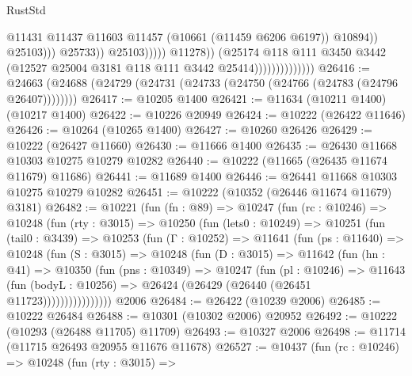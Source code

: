 \begin{lexlean}{RustStd}
\begin{coremodule}
                                                        @11431
                                                        @11437
                                                        @11603
                                                        @11457
                                                        (@10661 (@11459 @6206 @6197))
                                                        @10894))
                                                    @25103)))
                                              @25733))
                                          @25103)))))
                                @11278))
                            (@25174
                              @118
                              @111
                              @3450
                              @3442
                              (@12527 @25004 @3181 @118 @111 @3442 @25414))))))))))))))
@26416 := @24663 (@24688 (@24729 (@24731 (@24733 (@24750 (@24766 (@24783 (@24796 @26407))))))))
@26417 := @10205 @1400
@26421 := @11634 (@10211 @1400) (@10217 @1400)
@26422 := @10226 @20949
@26424 := @10222 (@26422 @11646)
@26426 := @10264 (@10265 @1400)
@26427 := @10260 @26426
@26429 := @10222 (@26427 @11660)
@26430 := @11666 @1400
@26435 := @26430 @11668 @10303 @10275 @10279 @10282
@26440 := @10222 (@11665 (@26435 @11674 @11679) @11686)
@26441 := @11689 @1400
@26446 := @26441 @11668 @10303 @10275 @10279 @10282
@26451 := @10222 (@10352 (@26446 @11674 @11679) @3181)
@26482 := @10221
    (fun (fn : @89) =>
    @10247
      (fun (rc : @10246) =>
      @10248
        (fun (rty : @3015) =>
        @10250
          (fun (lets0 : @10249) =>
          @10251
            (fun (tail0 : @3439) =>
            @10253
              (fun (Γ : @10252) =>
              @11641
                (fun (ps : @11640) =>
                @10248
                  (fun (S : @3015) =>
                  @10248
                    (fun (D : @3015) =>
                    @11642
                      (fun (hn : @41) =>
                      @10350
                        (fun (pns : @10349) =>
                        @10247
                          (fun (pl : @10246) =>
                          @11643
                            (fun (bodyL : @10256) =>
                            @26424 (@26429 (@26440 (@26451 @11723))))))))))))))))
    @2006
@26484 := @26422 (@10239 @2006)
@26485 := @10222 @26484
@26488 := @10301 (@10302 @2006) @20952
@26492 := @10222 (@10293 (@26488 @11705) @11709)
@26493 := @10327 @2006
@26498 := @11714 (@11715 @26493 @20955 @11676 @11678)
@26527 := @10437
    (fun (rc : @10246) =>
    @10248
      (fun (rty : @3015) =>

\end{coremodule}
\end{lexlean}
